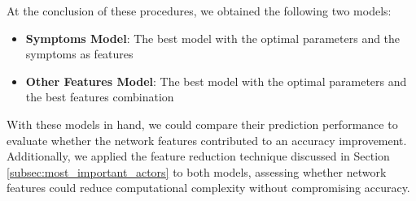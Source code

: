 At the conclusion of these procedures, we obtained the following two models:\\

\begin{itemize}
    \setlength\itemsep{0.4em} %
    \item \textbf{Symptoms Model}: The best model with the optimal parameters and the symptoms as features
    \item \textbf{Other Features Model}: The best model with the optimal parameters and the best features combination
\end{itemize}
\vspace{0.4cm}

With these models in hand, we could compare their prediction performance to evaluate whether the network 
features contributed to an accuracy improvement. Additionally, we applied the feature reduction technique discussed 
in Section \ref{subsec:most_important_actors} to both models, assessing whether network features could reduce computational 
complexity without compromising accuracy.

